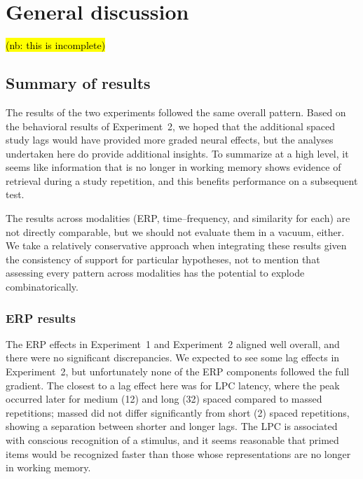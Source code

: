 
\chapter{General discussion}


\hl{(nb: this is incomplete)}

\section{Summary of results}


The results of the two experiments followed the same overall pattern.  Based on the behavioral results of Experiment~2, we hoped that the additional spaced study lags would have provided more graded neural effects, but the analyses undertaken here do provide additional insights.  To summarize at a high level, it seems like information that is no longer in working memory shows evidence of retrieval during a study repetition, and this benefits performance on a subsequent test.

The results across modalities (ERP, time--frequency, and similarity for each) are not directly comparable, but we should not evaluate them in a vacuum, either.
We take a relatively conservative approach when integrating these results given the consistency of support for particular hypotheses, not to mention that assessing every pattern across modalities has the potential to explode combinatorically.

\subsection{ERP results}


The ERP effects in Experiment~1 and Experiment~2 aligned well overall, and there were no significant discrepancies.  We expected to see some lag effects in Experiment~2, but unfortunately none of the ERP components followed the full gradient.  The closest to a lag effect here was for LPC latency, where the peak occurred later for medium (12) and long (32) spaced compared to massed repetitions; massed did not differ significantly from short (2) spaced repetitions, showing a separation between shorter and longer lags.  The LPC is associated with conscious recognition of a stimulus, and it seems reasonable that primed items would be recognized faster than those whose representations are no longer in working memory.


